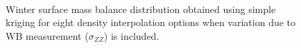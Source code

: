 \documentclass{sfuthesis}
\begin{document}
\begin{appendices}
\begin{figure}
	\centering
	\\
	\caption[]{Winter surface mass balance distribution obtained using simple kriging for eight density interpolation options when variation due to WB measurement ($\sigma_{ZZ}$) is included. }
	\label{fig:WSMB_SK_Distributionzz}
\end{figure}
\begin{figure}
	\centering
	\\

\end{figure}
\end{appendices}
\end{document}
